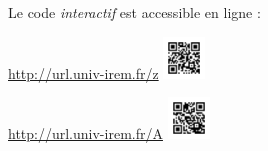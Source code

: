 \begin{remarque}
    Le code \emph{interactif} est accessible en ligne :
	
	\url{http://url.univ-irem.fr/z}\quad
	\href{http://url.univ-irem.fr/z}{\includegraphics[width=3em]{res/st-nonTruque-qr.png}} \par
	\url{http://url.univ-irem.fr/A}\quad
	\includegraphics[width=3em]{res/st-truque-qr.png}
	

\end{remarque}